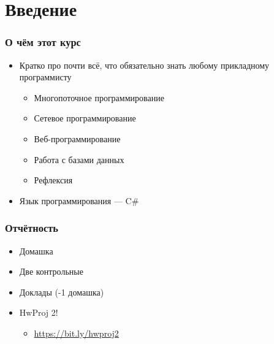\documentclass{../../slides-style}
\begin{document}
    \begin{frame}[plain]
        \titlepage
    \end{frame}

    \section{Введение}

    \begin{frame}
        \frametitle{О чём этот курс}
        \begin{itemize}
            \item Кратко про почти всё, что обязательно знать любому прикладному программисту
            \begin{itemize}
                \item Многопоточное программирование
                \item Сетевое программирование
                \item Веб-программирование
                \item Работа с базами данных
                \item Рефлексия
            \end{itemize}
            \item Язык программирования --- C\#
        \end{itemize}
    \end{frame}

    \begin{frame}
        \frametitle{Отчётность}
        \begin{itemize}
            \item Домашка
            \item Две контрольные
            \item Доклады (-1 домашка)
            \item HwProj 2! 
            \begin{itemize}
                \item \url{https://bit.ly/hwproj2}
            \end{itemize}
        \end{itemize}
    \end{frame}
\end{document}
